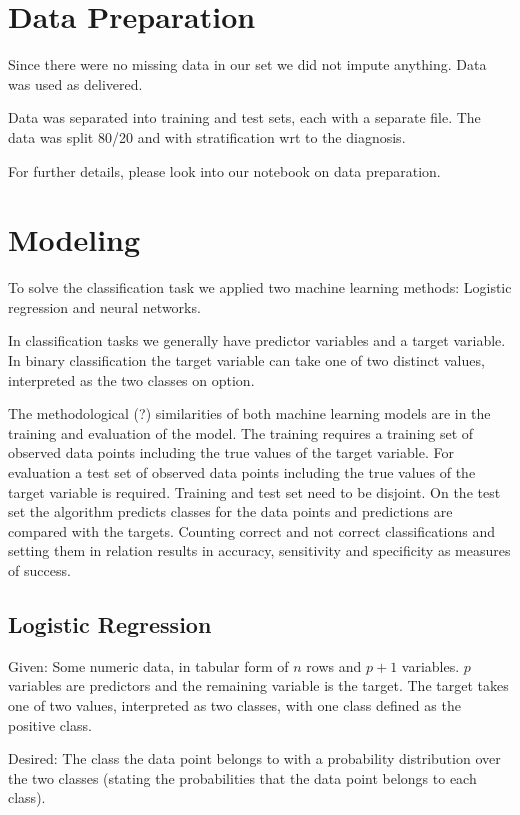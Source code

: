 \documentclass[]{article}
\begin{document}
\section{Data Preparation}\label{data-preparation}

Since there were no missing data in our set we did not impute anything.
Data was used as delivered.

Data was separated into training and test sets, each with a separate
file. The data was split 80/20 and with stratification wrt to the
diagnosis.

For further details, please look into our notebook on data preparation.

\section{Modeling}\label{modeling}

To solve the classification task we applied two machine learning
methods: Logistic regression and neural networks.

In classification tasks we generally have predictor variables and a
target variable. In binary classification the target variable can take
one of two distinct values, interpreted as the two classes on option.

The methodological (?) similarities of both machine learning models are
in the training and evaluation of the model. The training requires a
training set of observed data points including the true values of the
target variable. For evaluation a test set of observed data points
including the true values of the target variable is required. Training
and test set need to be disjoint. On the test set the algorithm predicts
classes for the data points and predictions are compared with the
targets. Counting correct and not correct classifications and setting
them in relation results in accuracy, sensitivity and specificity as
measures of success.

\subsection{Logistic Regression}\label{logistic-regression}

Given: Some numeric data, in tabular form of \(n\) rows and \(p+1\)
variables. \(p\) variables are predictors and the remaining variable is
the target. The target takes one of two values, interpreted as two
classes, with one class defined as the positive class.

Desired: The class the data point belongs to with a probability
distribution over the two classes (stating the probabilities that the
data point belongs to each class).
\end{document}
